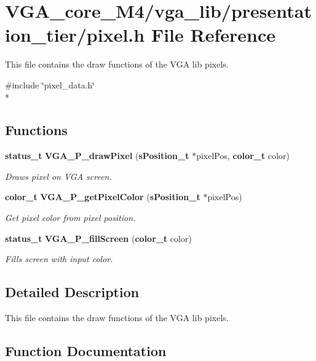 \section{V\+G\+A\+\_\+core\+\_\+\+M4/vga\+\_\+lib/presentation\+\_\+tier/pixel.h File Reference}
\label{pixel_8h}


This file contains the draw functions of the V\+GA lib pixels.  


{\ttfamily \#include \char`\"{}pixel\+\_\+data.\+h\char`\"{}}\\*
\subsection*{Functions}
\begin{DoxyCompactItemize}
\item 
{\bf status\+\_\+t} {\bf V\+G\+A\+\_\+\+P\+\_\+draw\+Pixel} ({\bf s\+Position\+\_\+t} $\ast$pixel\+Pos, {\bf color\+\_\+t} color)
\begin{DoxyCompactList}\small\item\em Draws pixel on V\+GA screen. \end{DoxyCompactList}\item 
{\bf color\+\_\+t} {\bf V\+G\+A\+\_\+\+P\+\_\+get\+Pixel\+Color} ({\bf s\+Position\+\_\+t} $\ast$pixel\+Pos)
\begin{DoxyCompactList}\small\item\em Get pixel color from pixel position. \end{DoxyCompactList}\item 
{\bf status\+\_\+t} {\bf V\+G\+A\+\_\+\+P\+\_\+fill\+Screen} ({\bf color\+\_\+t} color)
\begin{DoxyCompactList}\small\item\em Fills screen with input color. \end{DoxyCompactList}\end{DoxyCompactItemize}


\subsection{Detailed Description}
This file contains the draw functions of the V\+GA lib pixels. 



\subsection{Function Documentation}
